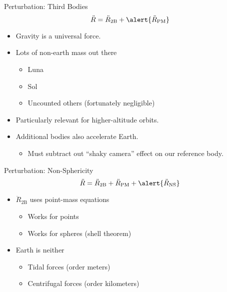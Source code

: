 \documentclass[pdf]{beamer}
\begin{document}
\begin{frame}{Perturbation: Third Bodies}
  \[ \ddot{R} = \ddot{R}_\text{2B} + \alert{\ddot{R}_\text{PM}}\]

  \begin{itemize}
  \item Gravity is a universal force.
  \item Lots of non-earth mass out there
    \begin{itemize}
    \item Luna
    \item Sol
    \item Uncounted others (fortunately negligible)
    \end{itemize}
  \item Particularly relevant for higher-altitude orbits.
  \item Additional bodies also accelerate Earth.
    \begin{itemize}
    \item Must subtract out ``shaky camera'' effect on our reference body.
    \end{itemize}
  \end{itemize}
\end{frame}

\begin{frame}{Perturbation: Non-Sphericity}
  \[ \ddot{R} = \ddot{R}_\text{2B} + \ddot{R}_\text{PM} + \alert{\ddot{R}_\text{NS}} \]
  \begin{itemize}
  \item $\ddot{R}_\text{2B}$ uses point-mass equations
    \begin{itemize}
    \item Works for points
    \item Works for spheres (shell theorem)
    \end{itemize}
  \item Earth is neither
    \begin{itemize}
    \item Tidal forces (order meters)
    \item Centrifugal forces (order kilometers)
    \end{itemize}
  \end{itemize}
\end{frame}
\end{document}
